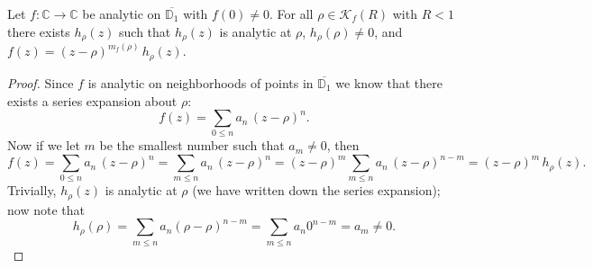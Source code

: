\begin{lemma}[ZeroFactorization]
\label{ZeroFactorization}
\leanok
Let $f:\mathbb{C}\to\mathbb{C}$ be analytic on $\overline{\mathbb{D}_1}$ with $f(0)\neq 0$.
    For all $\rho\in\mathcal{K}_f(R)$ with $R<1$ there exists $h_\rho(z)$ such that
    $h_\rho(z)$ is analytic at $\rho$, $h_\rho(\rho)\neq 0$, and
    $f(z)=(z-\rho)^{m_f(\rho)}\,h_\rho(z)$.
\end{lemma}
\begin{proof}
\leanok
Since $f$ is analytic on neighborhoods of points in $\overline{\mathbb{D}_1}$ we know
    that there exists a series expansion about $\rho$:
    $$f(z)=\sum_{0\leq n}a_n\,(z-\rho)^n.$$
    Now if we let $m$ be the smallest number such that $a_m\neq 0$, then
    $$f(z)=\sum_{0\leq n}a_n\,(z-\rho)^n=\sum_{m\leq n}a_n\,(z-\rho)^n
      =(z-\rho)^m\sum_{m\leq n}a_n\,(z-\rho)^{n-m}=(z-\rho)^m\,h_\rho(z).$$
    Trivially, $h_\rho(z)$ is analytic at $\rho$ (we have written down the series
    expansion); now note that
    $$h_\rho(\rho)=\sum_{m\leq n}a_n(\rho-\rho)^{n-m}=\sum_{m\leq n}a_n0^{n-m}=a_m\neq 0.$$
\end{proof}
